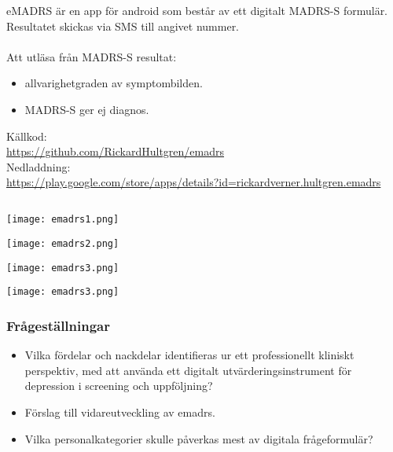 \documentclass[english]{beamer}
\begin{document}
\subsection{}
\begin{frame}
\ \\ 
eMADRS {\"a}r en app f{\"o}r android som best{\aa}r av ett digitalt MADRS-S formul{\"a}r. Resultatet skickas via SMS till angivet nummer.\\\ \\

Att utl{\"a}sa fr{\aa}n MADRS-S resultat:
	\begin{itemize}
	\item allvarighetgraden av symptombilden.
	\item MADRS-S ger ej diagnos.
	\end{itemize}
K{\"a}llkod:\\
\href{https://github.com/RickardHultgren/emadrs}{\url{https://github.com/RickardHultgren/emadrs}}\\
Nedladdning:\\
\href{https://play.google.com/store/apps/details?id=rickardverner.hultgren.emadrs}{\url{https://play.google.com/store/apps/details?id=rickardverner.hultgren.emadrs}}

\end{frame}

\subsection{}
\begin{frame}
\texttt{[image: emadrs1.png]}
\end{frame}

\begin{frame}
\texttt{[image: emadrs2.png]}
\end{frame}

\begin{frame}
\texttt{[image: emadrs3.png]}
\end{frame}

\begin{frame}
\texttt{[image: emadrs3.png]}
\end{frame}


\begin{frame}
\frametitle{Fr{\aa}gest{\"a}llningar}
	\begin{itemize}
	\item Vilka f{\"o}rdelar och nackdelar identifieras ur ett professionellt kliniskt perspektiv, med att anv{\"a}nda ett digitalt utv{\"a}rderingsinstrument f{\"o}r depression i screening och uppf{\"o}ljning?
	\item F{\"o}rslag till vidareutveckling av emadrs.
	\item Vilka personalkategorier skulle p{\aa}verkas mest av digitala fr{\aa}geformul{\"a}r?
	\end{itemize}
\end{frame}
\end{document}
